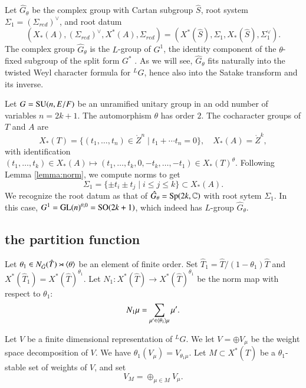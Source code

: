 Let $\hat G_\theta$ be the complex group with Cartan subgroup $\hat
S$, root system $\Sigma_1=(\Sigma_{red})^\vee$, and root datum
\[
(X_*(A),(\Sigma_{red})^\vee,X^*(A),\Sigma_{red}) 
= (X^*(\hat S),\Sigma_1,X_*(\hat S),\Sigma_1^\vee).
\]
The complex group $\hat G_\theta$ is the $L$-group of $G^1$, the
identity component of the $\theta$-fixed subgroup of the split form
$G^*$ \cite[\S1.3]{kottwitz1999foundations}.  As we will see, $\hat
G_\theta$ fits naturally into the twisted Weyl character formula for
${}^LG$, hence also into the Satake transform and its inverse.

\begin{example} Let $G={\operatorname{SU}}(n,E/F)$ be an unramified unitary group
  in an odd number of variables $n=2k+1$.  The automorphism $\theta$
  has order $2$.  The cocharacter groups of $T$ and $A$ are
\[
X_*(T) = \{(t_1,\ldots,t_{n})\in \ring{Z}^n\mid t_1+\cdots t_n=0\}, 
\quad
X_*(A)  = \ring{Z}^k,
\]
with identification $(t_1,\ldots,t_k)\in X_*(A)\mapsto
(t_1,\ldots,t_k,0,-t_k,\ldots,-t_1)\in X_*(T)^\theta$.  Following
Lemma \ref{lemma:norm}, we compute norms to get
\[
\Sigma_1 = \{\pm t_i\pm t_j\mid i\le j\le k\}\subset X_*(A).
\]
We recognize the root datum as that of $\hat G_\theta =
{\operatorname{Sp}}(2k,\mathbb{C})$ with root sytem $\Sigma_1$.  In this case, $G^1
= {\operatorname{GL}}(n)^{\theta,0} = {\operatorname{SO}}(2k+1)$, which indeed has $L$-group
$\hat G_\theta$.
\end{example}


\subsection{the partition function}

Let $\theta_1\in N_{\hat G}(\hat T) \rtimes \langle{\theta}\rangle$ be an
element of finite order.  Set $\hat T_1 = \hat T/(1-\theta_1)\hat T$
and $X^*(\hat T_1) = X^*(\hat T)^{\theta_1}$.  Let $N_1:X^*(\hat T)\to
X^*(\hat T)^{\theta_1}$ be the norm map with respect to $\theta_1$:
\[
N_1 \mu = \sum_{\mu'\in \langle{\theta_1}\rangle\mu} \mu'.
\]

Let $V$ be a finite dimensional representation of ${}^LG$.  We let
$V=\oplus V_\mu$ be the weight space decomposition of $V$.  We have
$\theta_1(V_\mu) = V_{\theta_1\mu}$.  Let $M\subset X^*(\hat T)$ be a
$\theta_1$-stable set of weights of $V$, and set
\begin{equation}\label{eqn:VM}
V_M = \oplus_{\mu\in M} V_\mu.
\end{equation}

